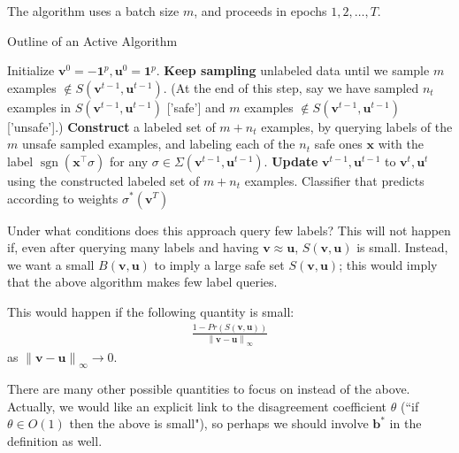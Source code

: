 \documentclass{article}
\newcommand{\vx}{\mathbf{x}}
\newcommand{\vb}{\mathbf{b}}
\newcommand{\vu}{\mathbf{u}}
\newcommand{\vv}{\mathbf{v}}
\newcommand{\vone}{\mathbf{1}}
\DeclareMathOperator{\sgn}{sgn}
\newcommand{\vnorm}[1]{\left\lVert#1\right\rVert} %
\newcommand{\lrsetb}[1]{\left\{#1\right\}}
\begin{document}
The algorithm uses a batch size $m$, and proceeds in epochs $1, 2, \dots, T$. 

\begin{algorithm}[]
   \caption{Outline of an Active Algorithm}
   \label{alg:activealg}
\begin{algorithmic}
   \STATE Initialize $\vv^{0} = - \vone^p, \vu^{0} = \vone^p$. 
   \STATE \textbf{Keep sampling} unlabeled data until we sample $m$ examples $\notin S (\vv^{t-1}, \vu^{t-1})$. 
   (At the end of this step, say we have sampled $n_t$ examples in $S (\vv^{t-1}, \vu^{t-1})$ ['safe']
   and $m$ examples $\notin S (\vv^{t-1}, \vu^{t-1})$ ['unsafe'].)
   \STATE \textbf{Construct} a labeled set of $m + n_t$ examples, by querying labels of the $m$ unsafe sampled examples, 
   and labeling each of the $n_t$ safe ones $\vx$ with the label $\sgn (\vx^\top \sigma)$ for any $\sigma \in \Sigma (\vv^{t-1}, \vu^{t-1})$.
   \STATE \textbf{Update} $\vv^{t-1}, \vu^{t-1}$ to $\vv^{t}, \vu^{t}$ using the constructed labeled set of $m + n_t$ examples. 
   \ENDFOR
    Classifier that predicts according to weights $\sigma^* (\vv^{T})$
\end{algorithmic}
\end{algorithm}

Under what conditions does this approach query few labels? 
This will not happen if, even after querying many labels and having $\vv \approx \vu$, 
$S (\vv, \vu)$ is small.
Instead, we want a small $B (\vv, \vu)$ to imply a large safe set $S (\vv, \vu)$; this would imply 
that the above algorithm makes few label queries. 

This would happen if the following quantity is small:
\begin{align*}
\frac{ 1 - Pr (S (\vv, \vu)) }{ \vnorm{\vv - \vu}_{\infty} }
\end{align*}
as $\vnorm{\vv - \vu}_{\infty} \to 0$. 

There are many other possible quantities to focus on instead of the above. 
Actually, we would like an explicit link to the disagreement coefficient $\theta$
(``if $\theta \in O(1)$ then the above is small"), 
so perhaps we should involve $\vb^*$ in the definition as well.
\end{document}
